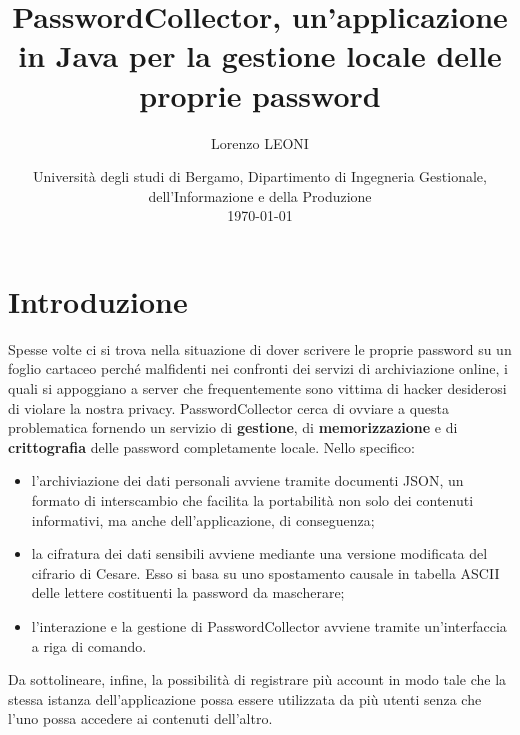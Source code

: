 \documentclass[a4paper, 12pt, one column, aas_macros]{article}
\title{PasswordCollector, un'applicazione in Java per la gestione locale delle proprie password}
\author{Lorenzo LEONI}
\date{%
	Università degli studi di Bergamo, Dipartimento di Ingegneria Gestionale, dell'Informazione e della Produzione\\[2ex]%
	\today
}
\begin{document}
	\maketitle
	
	\section{Introduzione}
	Spesse volte ci si trova nella situazione di dover scrivere le proprie password su un foglio cartaceo perché malfidenti nei confronti dei servizi di archiviazione online, i quali si appoggiano a server che frequentemente sono vittima di hacker desiderosi di violare la nostra privacy. PasswordCollector cerca di ovviare a questa problematica fornendo un servizio di \textbf{gestione}, di \textbf{memorizzazione} e di \textbf{crittografia} delle password completamente locale. Nello specifico:
	\begin{itemize}
		\item l'archiviazione dei dati personali avviene tramite documenti JSON, un formato di interscambio che facilita la portabilità non solo dei contenuti informativi, ma anche dell'applicazione, di conseguenza;
		\item la cifratura dei dati sensibili avviene mediante una versione modificata del cifrario di Cesare. Esso si basa su uno spostamento causale in tabella ASCII delle lettere costituenti la password da mascherare;
		\item l'interazione e la gestione di PasswordCollector avviene tramite un'interfaccia a riga di comando.
	\end{itemize}
	Da sottolineare, infine, la possibilità di registrare più account in modo tale che la stessa istanza dell'applicazione possa essere utilizzata da più utenti senza che l'uno possa accedere ai contenuti dell'altro.
	
\end{document}
